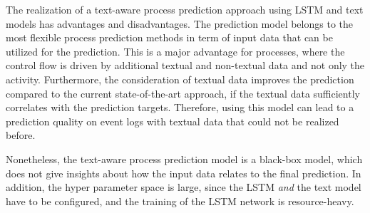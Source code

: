 The realization of a text-aware process prediction approach using LSTM and text models has advantages and disadvantages.
The prediction model belongs to the most flexible process prediction methods in term of input data that can be utilized for the prediction.
This is a major advantage for processes, where the control flow is driven by additional textual and non-textual data and not only the activity.
Furthermore, the consideration of textual data improves the prediction compared to the current state-of-the-art approach, if the textual data sufficiently correlates with the prediction targets.
Therefore, using this model can lead to a prediction quality on event logs with textual data that could not be realized before.

Nonetheless, the text-aware process prediction model is a black-box model, which does not give insights about how the input data relates to the final prediction.
In addition, the hyper parameter space is large, since the LSTM \textit{and} the text model have to be configured, and the training of the LSTM network is resource-heavy.